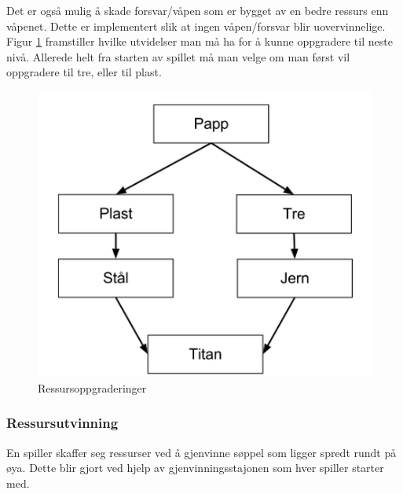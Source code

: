 Det er også mulig å skade forsvar/våpen som er bygget av en bedre ressurs enn våpenet. Dette er implementert slik at ingen våpen/forsvar blir uovervinnelige. Figur \ref{fig:ressursoppgraderinger} framstiller hvilke utvidelser man må ha for å kunne oppgradere til neste nivå. Allerede helt fra starten av spillet må man velge om man først vil oppgradere til tre, eller til plast.

	\begin{figure} [H]
				\begin{center}
					\includegraphics[scale=0.5]{images/oppgraderingstre}
				\end{center}
			\caption{Ressursoppgraderinger}
			\label{fig:ressursoppgraderinger}
	\end{figure}

\subsubsection{Ressursutvinning}
En spiller skaffer seg ressurser ved å gjenvinne søppel som ligger
spredt rundt på øya. Dette blir gjort ved hjelp av gjenvinningsstajonen
som hver spiller starter med.
